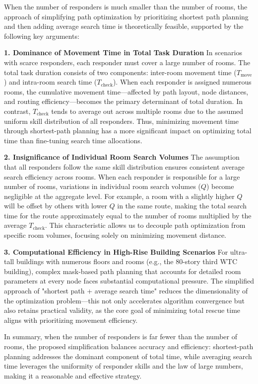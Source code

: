 When the number of responders is much smaller than the number of rooms, the approach of simplifying path optimization by prioritizing shortest path planning and then adding average search time is theoretically feasible, supported by the following key arguments:

\textbf{1. Dominance of Movement Time in Total Task Duration}
In scenarios with scarce responders, each responder must cover a large number of rooms. The total task duration consists of two components: inter-room movement time ($T_{\text{move}}$) and intra-room search time ($T_{\text{check}}$). When each responder is assigned numerous rooms, the cumulative movement time—affected by path layout, node distances, and routing efficiency—becomes the primary determinant of total duration. In contrast, $T_{\text{check}}$ tends to average out across multiple rooms due to the assumed uniform skill distribution of all responders. Thus, minimizing movement time through shortest-path planning has a more significant impact on optimizing total time than fine-tuning search time allocations.

\textbf{2. Insignificance of Individual Room Search Volumes}
The assumption that all responders follow the same skill distribution ensures consistent average search efficiency across rooms. When each responder is responsible for a large number of rooms, variations in individual room search volumes ($Q$) become negligible at the aggregate level. For example, a room with a slightly higher $Q$ will be offset by others with lower $Q$ in the same route, making the total search time for the route approximately equal to the number of rooms multiplied by the average $T_{\text{check}}$. This characteristic allows us to decouple path optimization from specific room volumes, focusing solely on minimizing movement distance.

\textbf{3. Computational Efficiency in High-Rise Building Scenarios}
For ultra-tall buildings with numerous floors and rooms (e.g., the 80-story third WTC building), complex mask-based path planning that accounts for detailed room parameters at every node faces substantial computational pressure. The simplified approach of "shortest path + average search time" reduces the dimensionality of the optimization problem—this not only accelerates algorithm convergence but also retains practical validity, as the core goal of minimizing total rescue time aligns with prioritizing movement efficiency.

In summary, when the number of responders is far fewer than the number of rooms, the proposed simplification balances accuracy and efficiency: shortest-path planning addresses the dominant component of total time, while averaging search time leverages the uniformity of responder skills and the law of large numbers, making it a reasonable and effective strategy.



